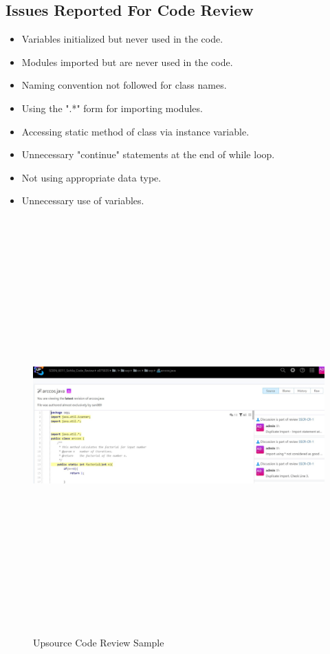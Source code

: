 \documentclass[a4paper,12pt]{article}
\begin{document}
\subsection{Issues Reported For Code Review}
\begin{itemize}
	\item Variables initialized but never used in the code.
	\item Modules imported but are never used in the code.
	\item Naming convention not followed for class names.
	\item Using the ".*" form for importing modules.
	\item Accessing static method of class via instance variable.
	\item Unnecessary "continue" statements at the end of while loop.
	\item Not using appropriate data type.
	\item Unnecessary use of variables.
\end{itemize}

\vspace{1cm}

\begin{figure}[htp]
	\centering
	\includegraphics[width=16cm,height=16cm,keepaspectratio]{sample_review.jpg}
	\caption{Upsource Code Review Sample}
	\label{fig:galaxy}
\end{figure}
\end{document}

